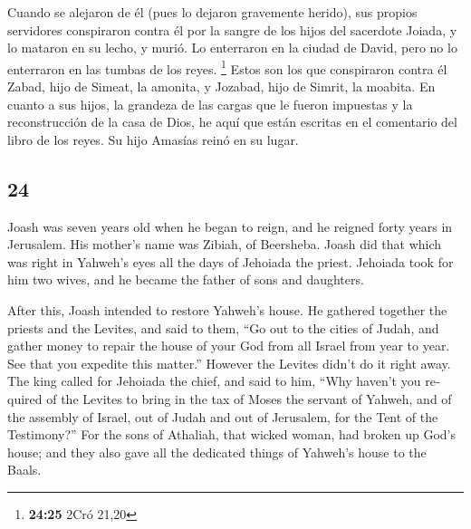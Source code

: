 \begin{paracol}{2}
 Cuando se alejaron de él (pues lo dejaron gravemente
herido), sus propios servidores conspiraron contra él por la sangre de
los hijos del sacerdote Joiada, y lo mataron en su lecho, y murió. Lo
enterraron en la ciudad de David, pero no lo enterraron en las tumbas de
los reyes. \footnote{\textbf{24:25} 2Cró 21,20}  Estos
son los que conspiraron contra él Zabad, hijo de Simeat, la amonita, y
Jozabad, hijo de Simrit, la moabita.  En cuanto a sus
hijos, la grandeza de las cargas que le fueron impuestas y la
reconstrucción de la casa de Dios, he aquí que están escritas en el
comentario del libro de los reyes. Su hijo Amasías reinó en su lugar.

\switchcolumn
\begin{otherlanguage}{english}

\hypertarget{section-47}{%
\section{24}\label{section-47}}

 Joash was seven years old when he began to reign, and he
reigned forty years in Jerusalem. His mother's name was Zibiah, of
Beersheba.  Joash did that which was right in Yahweh's
eyes all the days of Jehoiada the priest.  Jehoiada took
for him two wives, and he became the father of sons and daughters.

 After this, Joash intended to restore Yahweh's house.
 He gathered together the priests and the Levites, and
said to them, ``Go out to the cities of Judah, and gather money to
repair the house of your God from all Israel from year to year. See that
you expedite this matter.'' However the Levites didn't do it right away.
 The king called for Jehoiada the chief, and said to him,
``Why haven't you required of the Levites to bring in the tax of Moses
the servant of Yahweh, and of the assembly of Israel, out of Judah and
out of Jerusalem, for the Tent of the Testimony?''  For
the sons of Athaliah, that wicked woman, had broken up God's house; and
they also gave all the dedicated things of Yahweh's house to the Baals.


\end{otherlanguage}
\end{paracol}
